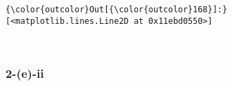 \documentclass[11pt]{article}
\begin{document}
            \begin{Verbatim}[commandchars=\\\{\}]
{\color{outcolor}Out[{\color{outcolor}168}]:} [<matplotlib.lines.Line2D at 0x11ebd0550>]
\end{Verbatim}
        
    \begin{center}
    \end{center}
    { \hspace*{\fill} \\}
    
    \subsubsection{2-(e)-ii}\label{e-ii}
\end{document}
